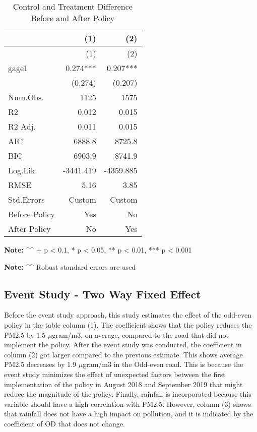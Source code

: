 \documentclass[
]{article}
\begin{document}
\begin{longtable}[]{@{}lrr@{}}
\caption{Control and Treatment Difference Before and After
Policy}\tabularnewline
\toprule\noalign{}
& (1) & (2) \\
\midrule\noalign{}
\endfirsthead
\toprule\noalign{}
& (1) & (2) \\
\midrule\noalign{}
\endhead
\bottomrule\noalign{}
\endlastfoot
gage1 & 0.274*** & 0.207*** \\
& (0.274) & (0.207) \\
Num.Obs. & 1125 & 1575 \\
R2 & 0.012 & 0.015 \\
R2 Adj. & 0.011 & 0.015 \\
AIC & 6888.8 & 8725.8 \\
BIC & 6903.9 & 8741.9 \\
Log.Lik. & -3441.419 & -4359.885 \\
RMSE & 5.16 & 3.85 \\
Std.Errors & Custom & Custom \\
Before Policy & Yes & No \\
After Policy & No & Yes \\
\end{longtable}

\textbf{Note:} \^{}\^{} + p \textless{} 0.1, * p \textless{} 0.05, ** p
\textless{} 0.01, *** p \textless{} 0.001

\textbf{Note:} \^{}\^{} Robust standard errors are used

\hypertarget{event-study---two-way-fixed-effect}{%
\subsection{Event Study - Two Way Fixed
Effect}\label{event-study---two-way-fixed-effect}}

Before the event study approach, this study estimates the effect of the
odd-even policy in the table column (1). The coefficient shows that the
policy reduces the PM2.5 by 1.5 \(\mu\)gram/m3, on average, compared to
the road that did not implement the policy. After the event study was
conducted, the coefficient in column (2) got larger compared to the
previous estimate. This shows average PM2.5 decreases by 1.9
\(\mu\)gram/m3 in the Odd-even road. This is because the event study
minimizes the effect of unexpected factors between the first
implementation of the policy in August 2018 and September 2019 that
might reduce the magnitude of the policy. Finally, rainfall is
incorporated because this variable should have a high correlation with
PM2.5. However, column (3) shows that rainfall does not have a high
impact on pollution, and it is indicated by the coefficient of OD that
does not change.
\end{document}
